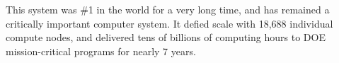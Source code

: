 This system was \#1 in the world for a very long time, and has remained
a critically important computer system. It defied scale with 18,688
individual compute nodes, and delivered tens of billions of computing
hours to DOE mission-critical programs for nearly 7 years. 
